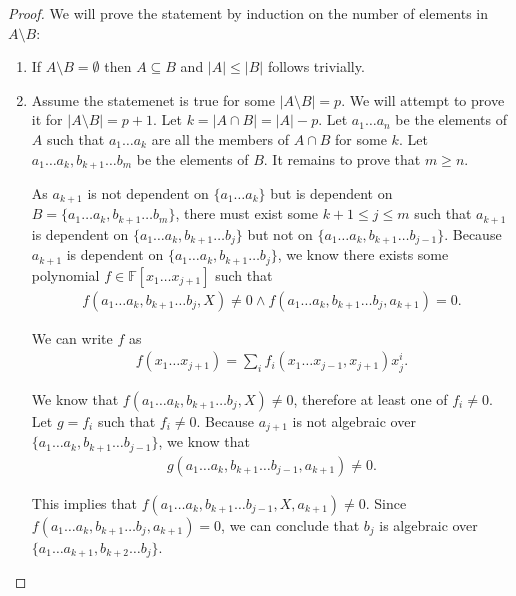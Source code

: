 \begin{proof}
	We will prove the statement by induction on the number of elements in $A \setminus B$:
	\begin{enumerate}
		\item If $A \setminus B = \emptyset $ then $A \subseteq B$ and $|A| \leq |B|$ follows trivially.
		\item Assume the statemenet is true for some $|A \setminus B| = p$. We will attempt to prove it for $|A \setminus B| = p + 1$. Let $k = |A \cap B| = |A| - p$. Let $a _1 \ldots a _n$ be the elements of $A$ such that $a _1 \ldots a_k$ are all the members of $A \cap B$ for some $k$. Let $ a _1 \ldots a_k, b _{k + 1} \ldots b _m$ be the elements of $B$. It remains to prove that $m \geq n$.

		      As $a _{k + 1}$ is not dependent on $\{a _1 \ldots a_k\}$ but is dependent on $B = \{a _1 \ldots a _k, b _{k + 1} \ldots b_m\}$, there must exist some $k + 1 \leq j \leq m$ such that $a _{k + 1}$ is dependent on $\{a _1 \ldots a _k, b _{k + 1} \ldots b_j\}$ but  not on $\{a _1 \ldots a _k, b _{k + 1} \ldots b _{j - 1}\}$. Because $a _{k + 1}$ is dependent on $\{a _1 \ldots a _k, b _{k + 1} \ldots b_j\}$, we know there exists some polynomial $f \in \mathbb F[x _1 \ldots x _{j + 1}]$ such that
		      \begin{align*}
			      f(a _1 \ldots a _{k}, b _{k + 1} \ldots b _{j}, X) \neq  0 \land
			      f(a _1 \ldots a _{k}, b _{k + 1} \ldots b _{j}, a _{k + 1})  = 0.
		      \end{align*}

		      We can write $f$ as
		      \begin{align*}
			      f(x _1 \ldots x _{j + 1})
			      = \sum_i f _i(x _1 \ldots x _{j - 1}, x _{j + 1}) x _j ^i.
		      \end{align*}

		      We know that $f(a _1 \ldots a _{k}, b _{k + 1} \ldots b _{j}, X) \neq  0$, therefore at least one of $f _i \neq 0$. Let $g = f _i $ such that $f _i \neq 0$. Because $a _{j + 1}$ is not algebraic over $\{a _1 \ldots a _k, b _{k + 1} \ldots b _{j - 1}\}$, we know that
		      \begin{align*}
			      g(a _1 \ldots a _k, b _{k + 1} \ldots b _{j - 1}, a _{k + 1}) \neq 0.
		      \end{align*}

		      This implies that $f(a _1 \ldots a _k, b _{k + 1} \ldots b _{j - 1}, X, a _{k + 1}) \neq 0$. Since $ f(a _1 \ldots a _{k}, b _{k + 1} \ldots b _{j}, a _{k + 1})  = 0$, we can conclude that $b_j$ is algebraic over $\{a _1 \ldots a _{k + 1}, b _{k + 2} \ldots b _j\}$.


\end{enumerate}
\end{proof}

